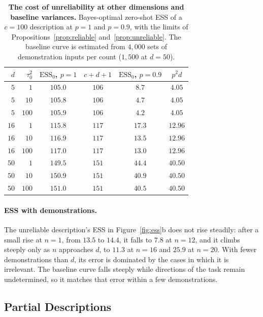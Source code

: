 \documentclass{article}
\theoremstyle{definition}
\newcommand{\ess}{\mathrm{ESS}}
\begin{document}
\begin{table}[!htb]
\centering\small
\caption{\textbf{The cost of unreliability at other dimensions and baseline variances.} Bayes-optimal zero-shot ESS of a $c=100$ description at $p=1$ and $p=0.9$, with the limits of Propositions~\ref{prop:reliable} and~\ref{prop:unreliable}. The baseline curve is estimated from $4{,}000$ sets of demonstration inputs per count ($1{,}500$ at $d=50$).}
\label{tab:grid}
\vspace{3pt}
\begin{tabular}{rrcccc}
\toprule
$d$ & $\tau_0^2$ & $\ess_0$, $p=1$ & $c+d+1$ & $\ess_0$, $p=0.9$ & $p^2d$ \\
\midrule
$5$ & $1$ & $105.0$ & $106$ & $8.7$ & $4.05$ \\
$5$ & $10$ & $105.8$ & $106$ & $4.7$ & $4.05$ \\
$5$ & $100$ & $105.9$ & $106$ & $4.2$ & $4.05$ \\
$16$ & $1$ & $115.8$ & $117$ & $17.3$ & $12.96$ \\
$16$ & $10$ & $116.9$ & $117$ & $13.5$ & $12.96$ \\
$16$ & $100$ & $117.0$ & $117$ & $13.0$ & $12.96$ \\
$50$ & $1$ & $149.5$ & $151$ & $44.4$ & $40.50$ \\
$50$ & $10$ & $150.9$ & $151$ & $40.9$ & $40.50$ \\
$50$ & $100$ & $151.0$ & $151$ & $40.5$ & $40.50$ \\
\bottomrule
\end{tabular}
\end{table}

\paragraph{ESS with demonstrations.}
The unreliable description's ESS in Figure~\ref{fig:ess}b does not rise steadily: after a small rise at $n=1$, from $13.5$ to $14.4$, it falls to $7.8$ at $n=12$, and it climbs steeply only as $n$ approaches $d$, to $11.3$ at $n=16$ and $25.9$ at $n=20$. With fewer demonstrations than $d$, its error is dominated by the cases in which it is irrelevant. The baseline curve falls steeply while directions of the task remain undetermined, so it matches that error within a few demonstrations.

\subsection{Partial Descriptions}\label{app:partial}
\end{document}

